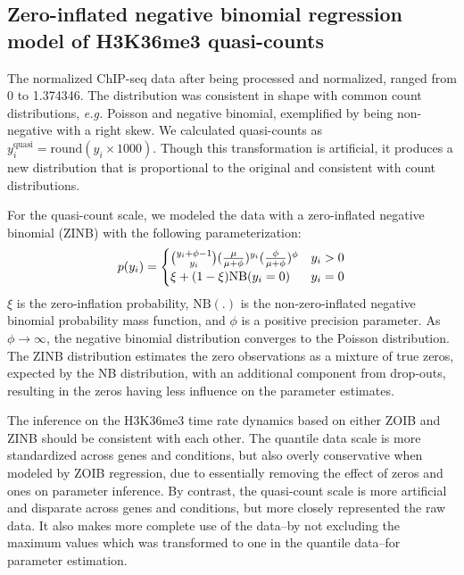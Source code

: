 \documentclass[11pt]{biorxiv}
\newcommand{\eg}{\emph{e.g.}\xspace}
\begin{document}
\subsection{Zero-inflated negative binomial regression model of H3K36me3 quasi-counts}
The normalized ChIP-seq data after being processed and normalized, ranged from 0 to 1.374346. The distribution was consistent in shape with common count distributions, \eg Poisson and negative binomial, exemplified by being non-negative with a right skew. We calculated quasi-counts as $y_{i}^{\text{quasi}} = \text{round}(y_{i} \times 1000)$. Though this transformation is artificial, it produces a new distribution that is proportional to the original and consistent with count distributions.

For the quasi-count scale, we modeled the data with a zero-inflated negative binomial (ZINB) with the following parameterization:
\begin{equation}
	p(y_{i}) = \begin{cases} 
			{{y_{i} + \phi - 1}\choose y_{i}} \large(\frac{\mu}{\mu + \phi}\large)^{y_{i}}\large(\frac{\phi}{\mu + \phi}\large)^{\phi} & y_{i} > 0 \\
      			\xi + (1 - \xi)\text{NB}(y_{i} = 0) & y_{i} = 0
   			\end{cases}
\end{equation}
$\xi$ is the zero-inflation probability, $\text{NB}(.)$ is the non-zero-inflated negative binomial probability mass function, and $\phi$ is a positive precision parameter. As $\phi \rightarrow \infty$, the negative binomial distribution converges to the Poisson distribution. The ZINB distribution estimates the zero observations as a mixture of true zeros, expected by the NB distribution, with an additional component from drop-outs, resulting in the zeros having less influence on the parameter estimates.

The inference on the H3K36me3 time rate dynamics based on either ZOIB and ZINB should be consistent with each other. The quantile data scale is more standardized across genes and conditions, but also overly conservative when modeled by ZOIB regression, due to essentially removing the effect of zeros and ones on parameter inference. By contrast, the quasi-count scale is more artificial and disparate across genes and conditions, but more closely represented the raw data. It also makes more complete use of the data--by not excluding the maximum values which was transformed to one in the quantile data--for parameter estimation.
\end{document}
